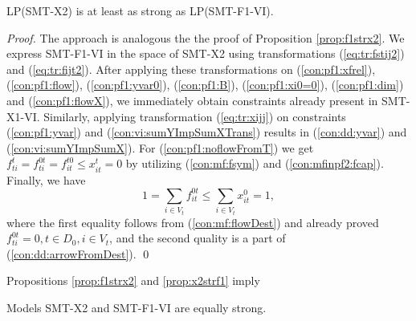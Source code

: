 \begin{prop}
\label{prop:x2strf1}
LP(SMT-X2) is at least as strong as LP(SMT-F1-VI). 
\end{prop}
\begin{proof}
The approach is analogous the the proof of Proposition \ref{prop:f1strx2}. We express SMT-F1-VI in the space of SMT-X2 using transformations (\ref{eq:tr:fstij2}) and (\ref{eq:tr:fijt2}). After applying these transformations on (\ref{con:pf1:xfrel}), (\ref{con:pf1:flow}), (\ref{con:pf1:yvar0}), (\ref{con:pf1:B}), (\ref{con:pf1:xi0=0}), (\ref{con:pf1:dim}) and (\ref{con:pf1:flowX}), we immediately obtain constraints already present in SMT-X1-VI. Similarly, applying transformation (\ref{eq:tr:xijj}) on constraints (\ref{con:pf1:yvar}) and (\ref{con:vi:sumYImpSumXTrans}) results in (\ref{con:dd:yvar}) and (\ref{con:vi:sumYImpSumX}). For (\ref{con:pf1:noflowFromT}) we get $f^t_{ti}=f^{0t}_{ti}=f^{t0}_{it}\leq x^t_{it}=0$ by utilizing (\ref{con:mf:fsym}) and (\ref{con:mfinpf2:fcap}). Finally, we have $$1=\sum_{i\in V_t}f^{0t}_{it}\leq \sum_{i\in V_t}x^0_{it}=1,$$ where the first equality follows from (\ref{con:mf:flowDest}) and already proved $f^{0t}_{ti}=0, t\in D_0,i\in V_t$, and the second quality is a part of (\ref{con:dd:arrowFromDest}).  
\qed
\end{proof}
Propositions \ref{prop:f1strx2} and \ref{prop:x2strf1} imply
\begin{corollary}
Models SMT-X2 and SMT-F1-VI are equally strong.
\end{corollary}

